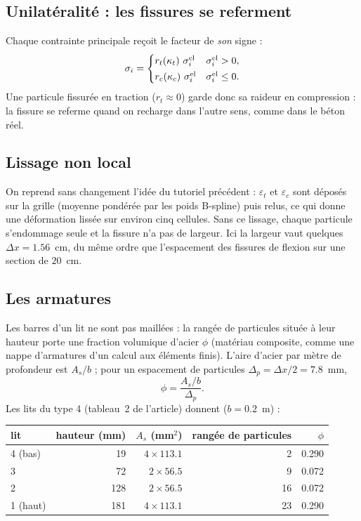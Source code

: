 \documentclass[11pt,a4paper]{article}
\begin{document}
\subsection{Unilatéralité : les fissures se referment}

Chaque contrainte principale reçoit le facteur de \emph{son} signe :
\begin{equation}
  \sigma_i = \begin{cases} r_t(\kappa_t)\ \sigma_i^{\rm el} & \sigma_i^{\rm el} > 0,\\[2pt]
                            r_c(\kappa_c)\ \sigma_i^{\rm el} & \sigma_i^{\rm el} \le 0. \end{cases}
\end{equation}
Une particule fissurée en traction ($r_t \approx 0$) garde donc sa raideur en compression : la
fissure se referme quand on recharge dans l'autre sens, comme dans le béton réel.

\subsection{Lissage non local}
\label{sec:nonlocal}

On reprend sans changement l'idée du tutoriel précédent : $\varepsilon_t$ et $\varepsilon_c$ sont
déposés sur la grille (moyenne pondérée par les poids B-spline) puis relus, ce qui donne une
déformation lissée sur environ cinq cellules. Sans ce lissage, chaque particule s'endommage seule et
la fissure n'a pas de largeur. Ici la largeur vaut quelques $\Delta x = 1.56$~cm, du même ordre que
l'espacement des fissures de flexion sur une section de $20$~cm.

\subsection{Les armatures}

Les barres d'un lit ne sont pas maillées : la rangée de particules située à leur hauteur porte une
fraction volumique d'acier $\phi$ (matériau composite, comme une \og nappe d'armatures \fg{} d'un
calcul aux éléments finis). L'aire d'acier par mètre de profondeur est $A_s/b$ ; pour un espacement
de particules $\Delta_p = \Delta x/2 = 7.8$~mm,
\[
  \phi = \frac{A_s/b}{\Delta_p}.
\]
Les lits du type 4 (tableau~2 de l'article) donnent ($b = 0.2$~m) :

\begin{center}
\begin{tabular}{@{}lrrrr@{}}
\toprule
lit & hauteur (mm) & $A_s$ (mm$^2$) & rangée de particules & $\phi$ \\
\midrule
4 (bas) & 19 & $4\times113.1$ & 2 & 0.290 \\
3 & 72 & $2\times56.5$ & 9 & 0.072 \\
2 & 128 & $2\times56.5$ & 16 & 0.072 \\
1 (haut) & 181 & $4\times113.1$ & 23 & 0.290 \\
\bottomrule
\end{tabular}
\end{center}
\end{document}
